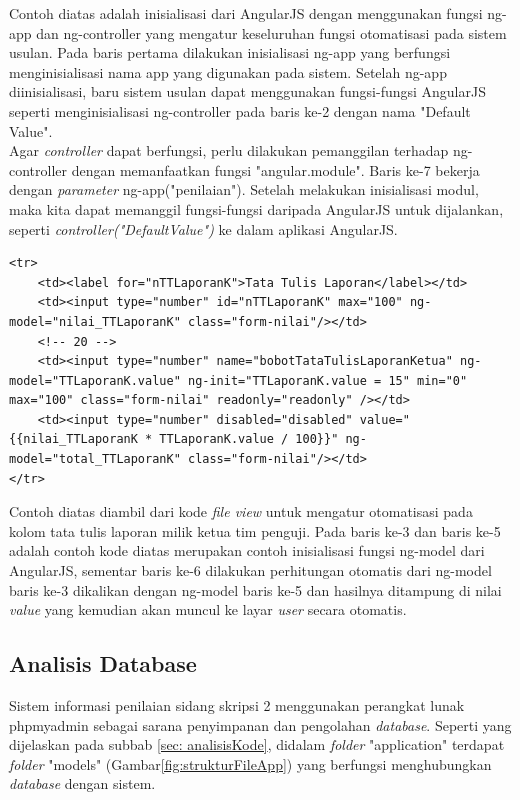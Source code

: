 	Contoh diatas adalah inisialisasi dari AngularJS dengan menggunakan fungsi ng-app dan ng-controller yang mengatur keseluruhan fungsi otomatisasi pada sistem usulan. Pada baris pertama dilakukan inisialisasi ng-app yang berfungsi menginisialisasi nama app yang digunakan pada sistem. Setelah ng-app diinisialisasi, baru sistem usulan dapat menggunakan fungsi-fungsi AngularJS seperti menginisialisasi ng-controller pada baris ke-2 dengan nama "Default Value".\\
	Agar \textit{controller} dapat berfungsi, perlu dilakukan pemanggilan terhadap ng-controller dengan memanfaatkan fungsi "angular.module". Baris ke-7 bekerja dengan \textit{parameter} ng-app("penilaian"). Setelah melakukan inisialisasi modul, maka kita dapat memanggil fungsi-fungsi daripada AngularJS untuk dijalankan, seperti \textit{controller("DefaultValue")} ke dalam aplikasi AngularJS.
	
\begin{lstlisting}
<tr>
	<td><label for="nTTLaporanK">Tata Tulis Laporan</label></td>
	<td><input type="number" id="nTTLaporanK" max="100" ng-model="nilai_TTLaporanK" class="form-nilai"/></td>
	<!-- 20 -->
	<td><input type="number" name="bobotTataTulisLaporanKetua" ng-model="TTLaporanK.value" ng-init="TTLaporanK.value = 15" min="0" max="100" class="form-nilai" readonly="readonly" /></td>
	<td><input type="number" disabled="disabled" value="{{nilai_TTLaporanK * TTLaporanK.value / 100}}" ng-model="total_TTLaporanK" class="form-nilai"/></td>
</tr>
\end{lstlisting}
	
	Contoh diatas diambil dari kode \textit{file view} untuk mengatur otomatisasi pada kolom tata tulis laporan milik ketua tim penguji. Pada baris ke-3 dan baris ke-5 adalah contoh kode diatas merupakan contoh inisialisasi fungsi ng-model dari AngularJS, sementar baris ke-6 dilakukan perhitungan otomatis dari ng-model baris ke-3 dikalikan dengan ng-model baris ke-5 dan hasilnya ditampung di nilai \textit{value} yang kemudian akan muncul ke layar \textit{user} secara otomatis.
		
	\subsection{Analisis Database}
	\label{sub: analisisDatabase}
	
	Sistem informasi penilaian sidang skripsi 2 menggunakan perangkat lunak phpmyadmin sebagai sarana penyimpanan dan pengolahan \textit{database}. Seperti yang dijelaskan pada subbab \ref{sec: analisisKode}, didalam \textit{folder} "application" terdapat \textit{folder} "models" (Gambar\ref{fig:strukturFileApp}) yang berfungsi menghubungkan \textit{database} dengan sistem. 
	
